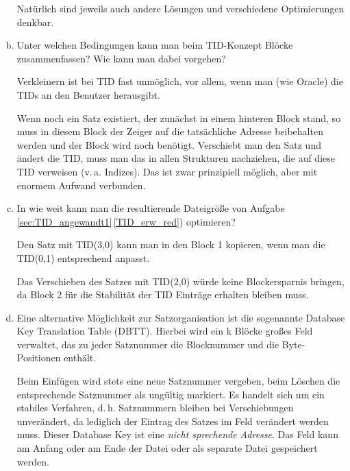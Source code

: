 \begin{enumerate}[a)]
	\begin{note}
	Natürlich sind jeweils auch andere Lösungen und verschiedene Optimierungen denkbar.
	\end{note}


	\item Unter welchen Bedingungen kann man beim TID-Konzept Blöcke zusammenfassen? Wie kann man dabei vorgehen?
	\label{TID_Zusammenfassen}

	\begin{solution}
	Verkleinern ist bei TID fast unmöglich, vor allem, wenn man (wie Oracle) die TIDs an den Benutzer herausgibt.

	Wenn noch ein Satz existiert, der zunächst in einem hinteren Block stand, so muss in diesem Block der Zeiger auf die tatsächliche Adresse beibehalten werden und der Block wird noch benötigt.
	Verschiebt man den Satz und ändert die TID, muss man das in allen Strukturen nachziehen, die auf diese TID verweisen (v.\,a. Indizes).
	Das ist zwar prinzipiell möglich, aber mit enormem Aufwand verbunden.
	\end{solution}

  \item In \deepen wie weit kann man die resultierende Dateigröße von Aufgabe \ref{sec:TID_angewandt1}\,\ref{TID_erw_red}) optimieren?

	\begin{note}
		Den Satz mit TID(3,0) kann man in den Block 1 kopieren, wenn man die TID(0,1) entsprechend anpasst.

		Das Verschieben des Satzes mit TID(2,0) würde keine Blockersparnis bringen, da Block 2 für die Stabilität der TID Einträge erhalten bleiben muss.
	\end{note}


	\item Eine alternative Möglichkeit zur Satzorganisation ist die sogenannte Database Key Translation Table (DBTT).
	Hierbei wird ein k Blöcke großes Feld verwaltet, das zu jeder Satznummer die Blocknummer und die Byte-Positionen enthält.

	Beim Einfügen wird stets eine neue Satznummer vergeben, beim Löschen die entsprechende Satznummer als ungültig markiert.
	Es handelt sich um ein stabiles Verfahren, d.\,h. Satznummern bleiben bei Verschiebungen unverändert, da lediglich der Eintrag des Satzes im Feld verändert werden muss.
	Dieser Database Key ist eine \emph{nicht sprechende Adresse}.	Das Feld kann am Anfang oder am Ende der Datei oder als separate Datei gespeichert werden.


\end{enumerate}

